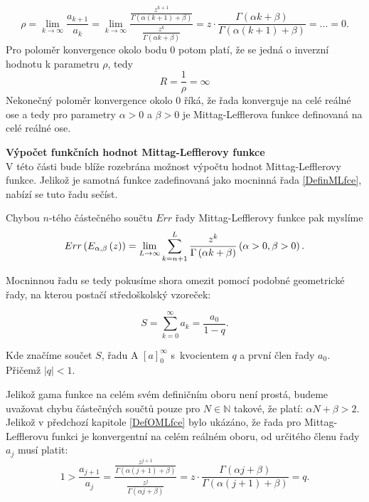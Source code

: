 \documentclass[a4paper,12pt,twoside]{article}
\theoremstyle{definition}
\newtheorem{defin}[veta]{Definice}
\theoremstyle{remark}
\numberwithin{equation}{section}
\numberwithin{table}{section}
\numberwithin{figure}{section}
\newcommand{\N}{\mathbb{N}}
\begin{document}
$$\rho = \lim_{k\to\infty} \frac{a_{k+1} }{a_{k}} = \lim_{k\to\infty} \frac{\frac{z^{k+1}}{\Gamma\left( \alpha \left(k+1\right) +\beta \right)}}{\frac{z^{k}}{\Gamma\left( \alpha k +\beta \right)} } = z \cdot \frac{\Gamma\left( \alpha k +\beta \right)}{\Gamma\left( \alpha \left(k+1\right) +\beta \right)} = ... = 0.$$
Pro poloměr konvergence okolo bodu 0 potom platí, že se jedná o inverzní hodnotu k parametru $\rho$, tedy
$$R = \frac{1}{\rho} = \infty$$
Nekonečný poloměr konvergence okolo $0$ říká, že řada konverguje na celé reálné ose a tedy pro parametry $\alpha > 0$ a $\beta > 0$ je Mittag-Lefflerova funkce definovaná na celé reálné ose.

\textbf{Výpočet funkčních hodnot Mittag-Lefflerovy funkce}\label{DefOMLfce} \\
V této části bude blíže rozebrána možnost výpočtu hodnot Mittag-Lefflerovy funkce. Jelikož je samotná funkce zadefinovaná jako mocninná řada \eqref{DefinMLfce}, nabízí se tuto řadu sečíst.

Chybou $n$-tého částečného součtu $Err$ řady Mittag-Lefflerovy funkce pak myslíme
\begin{equation} \label{ChybaSouctuRady}
	Err \left(E_{\alpha, \beta} \left( z\right)\right) = \lim_{L\to \infty} \sum_{k=n+1}^{L} \frac{z^{k}}{\Gamma\left( \alpha k +\beta \right)} \space \space \left( \alpha > 0, \beta > 0 \right).
\end{equation}

Mocninnou řadu se tedy pokusíme shora omezit pomocí podobné geometrické řady, na kterou postačí středoškolský vzoreček:

\begin{equation}\label{SoucetGeometrickeRady}
	S = \sum_{k=0}^{\infty} a_{k} = \frac{a_{0}}{1-q}.
\end{equation} 

Kde značíme součet $S$, řadu A $\left[a\right]_{0}^{\infty}$ s~kvocientem $q$ a první člen řady $a_0$. Přičemž $ |q| < 1$.

Jelikož gama funkce na celém svém definičním oboru není prostá, budeme uvažovat chybu částečných součtů pouze pro $N \in \N$ takové, že platí: $\alpha N + \beta > 2$.
Jelikož v předchozí kapitole \ref{DefOMLfce} bylo ukázáno, že řada pro Mittag-Lefflerovu funkci je konvergentní na celém reálném oboru, od určitého členu řady $a_j$ musí platit:
$$1 > \frac{ a_{j+1}}{a_{j}} = \frac{\frac{z^{j+1}}{\Gamma\left(\alpha \left(j+1\right) + \beta\right)}}{\frac{z^{j}}{\Gamma\left(\alpha j + \beta\right)}} = z \cdot \frac{\Gamma \left(\alpha j + \beta\right)}{\Gamma \left(\alpha \left(j+1\right) + \beta\right)} = q.$$
\end{document}
